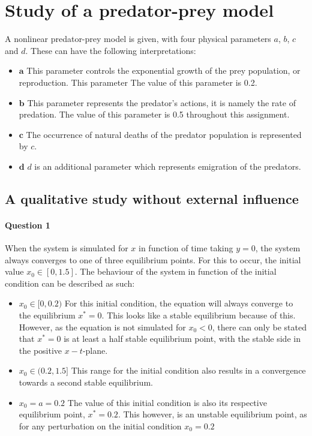 \documentclass[a4paper,11pt]{article}
\begin{document}
\newpage
\section{Study of a predator-prey model}
A nonlinear predator-prey model is given, with four physical parameters $a$, $b$, $c$ and $d$. These can have the following interpretations:
\begin{itemize}
	\item $\mathbf{a}$\; This parameter controls the exponential growth of the prey population, or reproduction. This parameter  The value of this parameter is 0.2. 	
 	\item $\mathbf{b}$\; This parameter represents the predator's actions, it is namely the rate of predation. The value of this parameter is 0.5 throughout this assignment.
  	\item $\mathbf{c}$\; The occurrence of natural deaths of the predator population is represented by $c$.
	\item $\mathbf{d}$\; $d$ is an additional parameter which represents emigration of the predators.
\end{itemize}
\subsection{ A qualitative study without external influence}
\paragraph{Question 1}\; When the system is simulated for $x$ in function of time taking $y=0$,
the system always converges to one of three equilibrium points. For this to occur, the initial value
$x_0\in[0,1.5]$. The behaviour of the system in function of the initial condition can be described as such:
\begin{itemize}
	\item $x_0\in[0,0.2)$\; For this initial condition, the equation will always converge to the equilibrium $x^*=0$. This looks
	like a stable equilibrium because of this. However, as the equation is not simulated for $x_0<0$, there can only be stated 
	that $x^*=0$ is at least a half stable equilibrium point, with the stable side in the positive $x-t$-plane.
	\item $x_0\in(0.2,1.5]$\; This range for the initial condition also results in a convergence towards a second stable equilibrium.
	\item $x_0=a=0.2$\; The value of this initial condition is also its respective equilibrium point, $x^*=0.2$. This however, is an 
	unstable equilibrium point, as for any perturbation on the initial condition $x_0=0.2$ 
\end{itemize}
\end{document}
